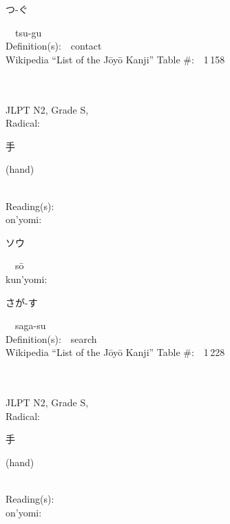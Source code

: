 \begin{multicols}{2}
{\hspace*{2em}}{\begin{CJK}{UTF8}{min} つ-ぐ \end{CJK}}\ \ tsu-gu\ \ \\
Definition(s):\ \ contact \\
Wikipedia ``List of the J\=oy\=o Kanji'' Table \#:\ \ 1\,158 \\
\ \ \\
{\fontsize{34pt}{40pt}  }\ \ \\  %
{JLPT N2, Grade S, \\Radical:\ \ {\begin{CJK}{UTF8}{min} 手 \end{CJK}} (hand) } \\
Reading(s):\ \ \\
{\hspace*{1em}}on'yomi:\ \ \\
{\hspace*{2em}}{\begin{CJK}{UTF8}{min} ソウ \end{CJK}}\ \ s\=o\ \ \\
{\hspace*{1em}}kun'yomi:\ \ \\
{\hspace*{2em}}{\begin{CJK}{UTF8}{min} さが-す \end{CJK}}\ \ saga-su\ \ \\
Definition(s):\ \ search \\
Wikipedia ``List of the J\=oy\=o Kanji'' Table \#:\ \ 1\,228 \\
\ \ \\
{\fontsize{34pt}{40pt}  }\ \ \\  %
{JLPT N2, Grade S, \\Radical:\ \ {\begin{CJK}{UTF8}{min} 手 \end{CJK}} (hand) } \\
Reading(s):\ \ \\
{\hspace*{1em}}on'yomi:\ \ \\

\end{multicols}
